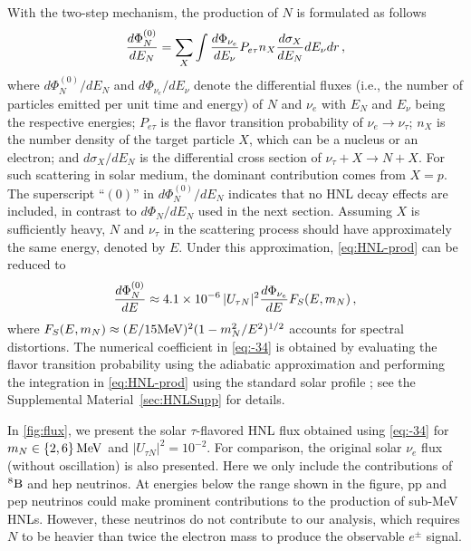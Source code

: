 \documentclass[aps,prd,twocolumn,preprintnumbers,superscriptaddress,nofootinbib]{revtex4-1}
\begin{document}
With the two-step mechanism, the production of $N$ is formulated
as follows
\begin{equation}
\frac{d\Phi_{N}^{(0)}}{dE_{N}}=\sum_{X}\int\frac{d\Phi_{\nu_{e}}}{dE_{\nu}}P_{e\tau}n_{X}\frac{d\sigma_{X}}{dE_{N}}dE_{\nu}dr\thinspace,\label{eq:HNL-prod}
\end{equation}
where $d\Phi_{N}^{(0)}/dE_{N}$ and $d\Phi_{\nu_{e}}/dE_{\nu}$ denote
the differential fluxes (i.e., the number of particles emitted per unit time and energy) of $N$ and $\nu_{e}$ with $E_{N}$
and $E_{\nu}$ being the respective energies; $P_{e\tau}$ is the
flavor transition probability of $\nu_{e}\to\nu_{\tau}$; $n_{X}$
is the number density of the target particle $X$, which can be a
nucleus or an electron; and $d\sigma_{X}/dE_{N}$ is the differential
cross section of $\nu_{\tau}+X\to N+X$. For such scattering in solar medium, the dominant contribution comes from $X=p$. The
superscript ``$(0)$'' in $d\Phi_{N}^{(0)}/dE_{N}$ indicates that no HNL decay effects are included, in contrast to $d\Phi_{N}/dE_{N}$ used in the next section. Assuming $X$ is sufficiently heavy, $N$
and $\nu_{\tau}$ in the scattering process should have approximately
the same energy, denoted by $E$. Under this approximation, \cref{eq:HNL-prod}
can be reduced to
\begin{equation}
\frac{d\Phi_{N}^{(0)}}{dE}\approx 4.1\times10^{-6}\,|U_{\tau N}|^2\frac{d\Phi_{\nu_{e}}}{dE}F_{S}(E,m_{N})\thinspace,\label{eq:-34}
\end{equation}
where 
$F_{S}(E,m_{N})\approx (E/15 {\rm MeV})^2 (1-m_N^2/E^2)^{1/2}$ accounts for spectral distortions. 
The numerical coefficient in \cref{eq:-34} is obtained by evaluating the flavor transition probability using the adiabatic approximation \cite{Haxton:1986dm,Parke:1986jy,Petcov:1987zj,deHolanda:2004fd} and performing the integration in \cref{eq:HNL-prod} using the standard solar profile \cite{Vinyoles:2016djt}; see the Supplemental Material~\ref{sec:HNLSupp}
for details.

In \cref{fig:flux}, we present the solar $\tau$-flavored HNL flux obtained using \cref{eq:-34} for $m_N\in \{2, 6\}\,{\rm MeV}$ and $|U_{\tau N}|^2=10^{-2}$. For comparison, the original solar $\nu_e$ flux (without oscillation) is also presented. Here we only include the contributions of $^{8}{\rm B}$ and hep neutrinos. At energies below the range shown in the figure, pp and pep neutrinos could make prominent contributions to the production of sub-MeV HNLs. However, these neutrinos do not contribute to our analysis, which requires $N$ to be heavier than twice the electron mass to produce the observable $e^\pm$ signal. 
\end{document}
